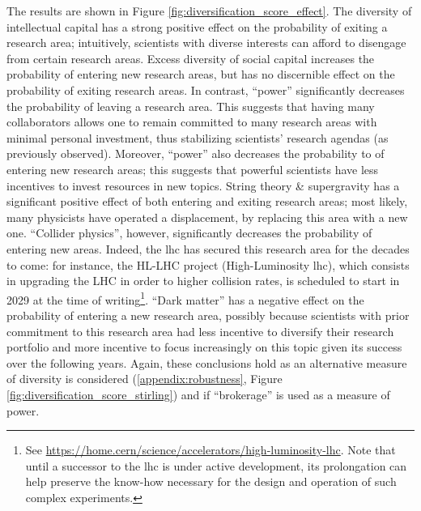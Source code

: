 \documentclass{article}
\begin{document}
The results are shown in Figure \ref{fig:diversification_score_effect}. The diversity of intellectual capital has a strong positive effect on the probability of exiting a research area; intuitively, scientists with diverse interests can afford to disengage from certain research areas. Excess diversity of social capital increases the probability of entering new research areas, but has no discernible effect on the probability of exiting research areas. In contrast, ``power'' significantly decreases the probability of leaving a research area. This suggests that having many collaborators allows one to remain committed to many research areas with minimal personal investment, thus stabilizing scientists' research agendas (as previously observed). Moreover, ``power'' also decreases the probability to of entering new research areas; this suggests that powerful scientists have less incentives to invest resources in new topics. String theory \& supergravity has a significant positive effect of both entering and exiting research areas; most likely, many physicists have operated a displacement, by replacing this area with a new one. ``Collider physics'', however, significantly decreases the probability of entering new areas. Indeed, the \gls{lhc} has secured this research area for the decades to come: %
for instance, the HL-LHC project (High-Luminosity \gls{lhc}), which consists in upgrading the LHC in order to higher collision rates, is scheduled to start in 2029 at the time of writing\footnote{See \url{https://home.cern/science/accelerators/high-luminosity-lhc}. Note that until a successor to the \gls{lhc} is under active development, its prolongation can help preserve the know-how necessary for the design and operation of such complex experiments.}. ``Dark matter'' has a negative effect on the probability of entering a new research area, possibly because scientists with prior commitment to this research area had less incentive to diversify their research portfolio and more incentive to focus increasingly on this topic given its success over the following years. Again, these conclusions hold as an alternative measure of diversity is considered (\ref{appendix:robustness}, Figure \ref{fig:diversification_score_stirling}) and if ``brokerage'' is used as a measure of power.
 
\end{document}
